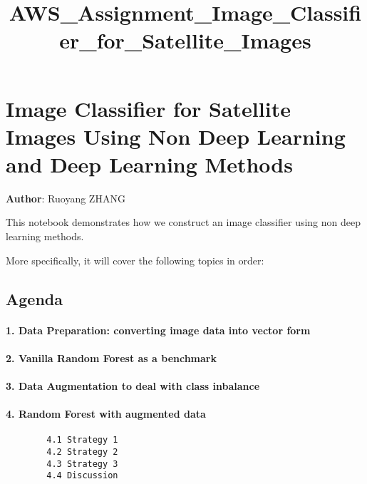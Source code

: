 \documentclass[11pt]{article}
\title{AWS\_Assignment\_Image\_Classifier\_for\_Satellite\_Images}
\begin{document}
    
    
    \maketitle
    
    

    
    \section{Image Classifier for Satellite Images Using Non Deep Learning
and Deep Learning
Methods}\label{image-classifier-for-satellite-images-using-non-deep-learning-and-deep-learning-methods}

\textbf{Author}: Ruoyang ZHANG

This notebook demonstrates how we construct an image classifier using
non deep learning methods.

More specifically, it will cover the following topics in order:

\subsection{Agenda}\label{agenda}

\paragraph{1. Data Preparation: converting image data into vector
form}\label{data-preparation-converting-image-data-into-vector-form}

\paragraph{2. Vanilla Random Forest as a
benchmark}\label{vanilla-random-forest-as-a-benchmark}

\paragraph{3. Data Augmentation to deal with class
inbalance}\label{data-augmentation-to-deal-with-class-inbalance}

\paragraph{4. Random Forest with augmented
data}\label{random-forest-with-augmented-data}

\begin{verbatim}
        4.1 Strategy 1
        4.2 Strategy 2
        4.3 Strategy 3
        4.4 Discussion
\end{verbatim}
\end{document}
